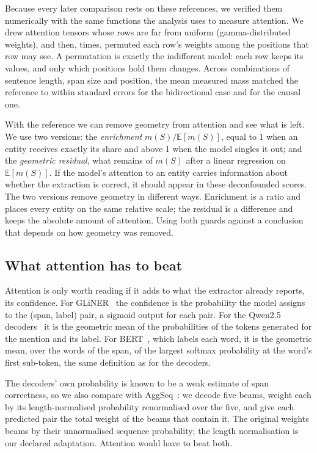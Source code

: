 \documentclass[11pt,a4paper]{article}
\newcommand{\gliner}{GLiNER}
\begin{document}
Because every later comparison rests on these references, we verified them
numerically with the same functions the analysis uses to measure attention. We drew attention tensors whose rows are far
from uniform (gamma-distributed weights), and then, \nullPerm{} times, permuted each row's weights among the positions that
row may see. A permutation is exactly the indifferent model: each row keeps its values, and only which positions hold them
changes. Across \nullConfigs{} combinations of sentence length, span size and position, the mean measured mass matched
the reference to within \nullBidMaxZ{} standard errors for the bidirectional case and \nullCauMaxZ{} for the causal one.

With the reference we can remove geometry from attention and see what is left.
We use two versions: the \emph{enrichment} $m(S)/\mathbb{E}[m(S)]$, equal to 1 when an entity receives exactly its share and
above 1 when the model singles it out; and the \emph{geometric residual}, what remains of $m(S)$ after a linear regression on
$\mathbb{E}[m(S)]$. If the model's attention to an entity carries information about whether the extraction is correct, it
should appear in these deconfounded scores. The two versions remove geometry in different ways. Enrichment is a ratio and places every
entity on the same relative scale; the residual is a difference and keeps the absolute amount of attention. Using both guards
against a conclusion that depends on how geometry was removed.

\subsection{What attention has to beat}
\label{sec:scores}

Attention is only worth reading if it adds to what the extractor already reports, its confidence. For
\gliner{}~\citep{Zaratiana2024gliner} the confidence is the probability the model assigns to the (span, label) pair, a sigmoid output for each pair. For the
Qwen2.5 decoders~\citep{qwen2025} it is the geometric mean of the probabilities of the tokens generated for the mention and its label.
For BERT~\citep{Devlin2019}, which labels each word, it is the geometric mean, over the words of the span, of the largest
softmax probability at the word's first sub-token, the same definition as for the decoders.

The decoders' own probability is known to be a weak estimate of span
correctness, so we also compare with AggSeq~\citep{hashimoto2024beam}: we decode five beams, weight each by its
length-normalised probability renormalised over the five, and give each predicted pair the total weight of the beams that
contain it. The original weights beams by their unnormalised sequence probability; the length normalisation is our declared
adaptation. Attention would have to beat both.
\end{document}
